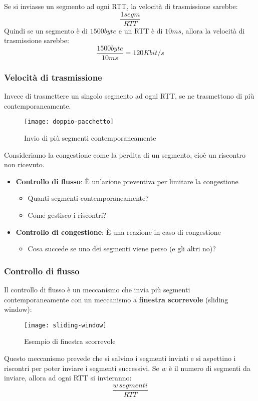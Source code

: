 \documentclass[a4paper]{article}
\begin{document}
\noindent 
Se si inviasse un segmento ad ogni RTT, la velocità di trasmissione sarebbe:
\[
  \frac{1segm}{RTT}
\]
Quindi se un segmento è di \( 1500byte \) e un RTT è di \( 10ms \), allora la velocità
di trasmissione sarebbe:
\[
  \frac{1500byte}{10ms} = 120Kbit/s
\]

\subsubsection{Velocità di trasmissione}
Invece di trasmettere un singolo segmento ad ogni RTT, se ne trasmettono di più
contemporaneamente.
\begin{figure}[H]
  \centering
  \texttt{[image: doppio-pacchetto]}
  \caption{Invio di più segmenti contemporaneamente}
\end{figure}

\noindent
Consideriamo la congestione come la perdita di un segmento, cioè un riscontro non
ricevuto.
\begin{itemize}
  \item \textbf{Controllo di flusso}: È un'azione preventiva per limitare la congestione
    \begin{itemize}
      \item 
        Quanti segmenti contemporaneamente? 
      \item 
        Come gestisco i riscontri? 
    \end{itemize}

  \item \textbf{Controllo di congestione}: È una reazione in caso di congestione
    \begin{itemize}
      \item 
        Cosa succede se uno dei segmenti viene perso (e gli altri no)? 
    \end{itemize}
\end{itemize}

\subsubsection{Controllo di flusso}
Il controllo di flusso è un meccanismo che invia più segmenti contemporaneamente con un
meccanismo a \textbf{finestra scorrevole} (sliding window):
\begin{figure}[H]
  \centering
  \texttt{[image: sliding-window]}
  \caption{Esempio di finestra scorrevole}
\end{figure}
\noindent
Questo meccanismo prevede che si salvino i segmenti inviati e si aspettino i riscontri
per poter inviare i segmenti successivi. Se \( w \) è il numero di segmenti da inviare,
allora ad ogni RTT si invieranno:
\[
\frac{w\,segmenti}{RTT}
\] 
\end{document}
